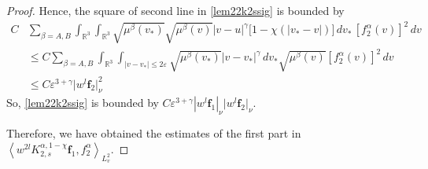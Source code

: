 \documentclass[reqno]{amsart}
\numberwithin{equation}{section}
\numberwithin{equation}{section}
\begin{document}
\begin{proof}
		Hence, the square of second line in \eqref{lem22k2ssig} is
		bounded by
		\begin{align*}
			C &\sum_{\beta=A,B}\int_{\mathbb{R}^3} \int_{\mathbb{R}^3}\sqrt{\mu^\beta(v_*)}\sqrt{\mu^{\beta}(v)} |v - u|^\gamma \big[1 - \chi(|v_* - v|)\big] \,dv_*\,[f^\alpha_2(v)]^2\,dv \\
			&\leq C \sum_{\beta=A,B} \int_{\mathbb{R}^3} \int_{|v - v_*| \leq 2\varepsilon} \sqrt{\mu^\beta(v_*)} |v - v_*|^\gamma \,dv_*  \sqrt{\mu^{\beta}(v)} [f^\alpha_2(v)]^2 \,dv \\
			&\leq C\varepsilon^{3+\gamma} \big|w^{l} \mathbf{f}_2\big|_\nu^2
		\end{align*}
		So, \eqref{lem22k2ssig} is bounded by $C\varepsilon^{3+\gamma} |w^{l} \mathbf{f}_1|_\nu \big|w^{l} \mathbf{f}_2\big|_\nu$.
		
		Therefore, we have obtained the estimates of the first part in $\left \langle  w^{2l}K_{2,s}^{\alpha,1-\chi}\mathbf{f}_1,f^{\alpha}_2\right \rangle_{L^{2}_{v}} $.
		

\end{proof}
\end{document}
